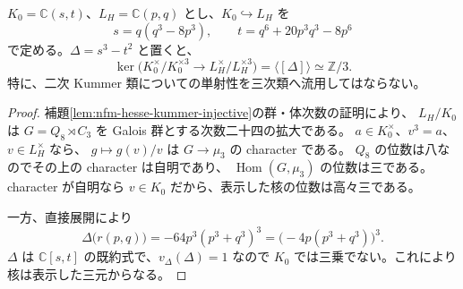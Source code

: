 \begin{lemma}
\label{lem:nfm-hesse-cubic-kummer-kernel}
$K_0=\mathbb C(s,t)$、$L_H=\mathbb C(p,q)$ とし、$K_0\hookrightarrow L_H$ を
\[
 s=q(q^3-8p^3),\qquad t=q^6+20p^3q^3-8p^6
\]
で定める。$\Delta=s^3-t^2$ と置くと、
\[
 \ker\bigl(K_0^\times/K_0^{\times3}\longrightarrow
                 L_H^\times/L_H^{\times3}\bigr)
       =\langle[\Delta]\rangle\simeq\mathbb Z/3.
\]
特に、二次 Kummer 類についての単射性を三次類へ流用してはならない。
\end{lemma}
\begin{proof}
補題\ref{lem:nfm-hesse-kummer-injective}の群・体次数の証明により、
$L_H/K_0$ は $G=Q_8\rtimes C_3$ を Galois 群とする次数二十四の拡大である。
$a\in K_0^\times$、$v^3=a$、$v\in L_H^\times$ なら、
$g\mapsto g(v)/v$ は $G\to\mu_3$ の character である。
$Q_8$ の位数は八なのでその上の character は自明であり、
$\operatorname{Hom}(G,\mu_3)$ の位数は三である。
character が自明なら $v\in K_0$ だから、表示した核の位数は高々三である。

一方、直接展開により
\[
 \Delta\bigl(r(p,q)\bigr)
       =-64p^3(p^3+q^3)^3
       =\bigl(-4p(p^3+q^3)\bigr)^3.
\]
$\Delta$ は $\mathbb C[s,t]$ の既約式で、$v_\Delta(\Delta)=1$ なので
$K_0$ では三乗でない。これにより核は表示した三元からなる。
\end{proof}

